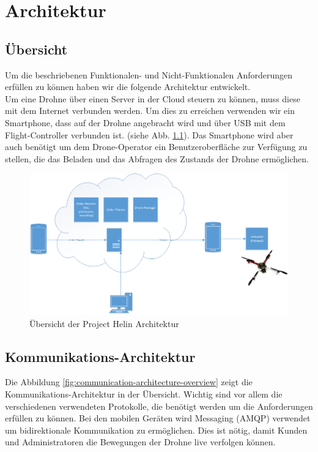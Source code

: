 \chapter{Architektur}

\section{Übersicht}

Um die beschriebenen Funktionalen- und Nicht-Funktionalen Anforderungen erfüllen zu können haben wir die folgende Architektur entwickelt. \\

Um eine Drohne über einen Server in der Cloud steuern zu können, muss diese mit dem Internet verbunden werden. Um dies zu erreichen verwenden wir ein Smartphone, dass auf der Drohne angebracht wird und über USB mit dem Flight-Controller verbunden ist.  (siehe Abb. \ref{fig:architecture-overview}). Das Smartphone wird aber auch benötigt um dem Drone-Operator ein Benutzeroberfläche zur Verfügung zu stellen, die das Beladen und das Abfragen des Zustands der Drohne ermöglichen. \\

\begin{figure}[h]
	\includegraphics[width=1.0\textwidth]{images/Overview-Diagram.png}
	\caption{Übersicht der Project Helin Architektur }
	\label{fig:architecture-overview}
\end{figure}

\section{Kommunikations-Architektur}

Die Abbildung \ref{fig:communication-architecture-overview} zeigt die Kommunikations-Architektur in der Übersicht. Wichtig sind vor allem die verschiedenen verwendeten Protokolle, die benötigt werden um die Anforderungen erfüllen zu können. Bei den mobilen Geräten wird Messaging (AMQP) verwendet um bidirektionale Kommunikation zu ermöglichen. Dies ist nötig, damit Kunden und Administratoren die Bewegungen der Drohne live verfolgen können. 

